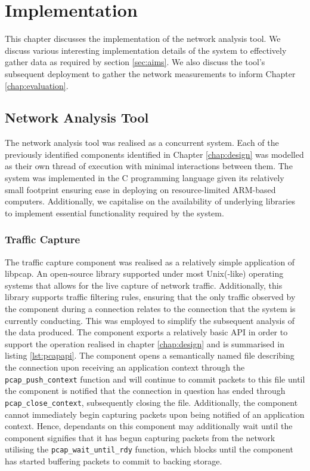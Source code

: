 \documentclass{l4proj}
\begin{document}
\chapter{Implementation}
\label{chap:implementation}


This chapter discusses the implementation of the network analysis tool. We discuss various interesting implementation details of the system to effectively gather data as required by section \ref{sec:aims}. We also discuss the tool's subsequent deployment to gather the network measurements to inform Chapter \ref{chap:evaluation}.

\section{Network Analysis Tool}

The network analysis tool was realised as a concurrent system. Each of the previously identified components identified in Chapter \ref{chap:design} was modelled as their own thread of execution with minimal interactions between them. The system was implemented in the C programming language given its relatively small footprint ensuring ease in deploying on resource-limited ARM-based computers. Additionally, we capitalise on the availability of underlying libraries to implement essential functionality required by the system.

\subsection{Traffic Capture}

The traffic capture component was realised as a relatively simple application of libpcap. An open-source library supported under most Unix(-like) operating systems that allows for the live capture of network traffic. Additionally, this library supports traffic filtering rules, ensuring that the only traffic observed by the component during a connection relates to the connection that the system is currently conducting. This was employed to simplify the subsequent analysis of the data produced. The component exports a relatively basic API in order to support the operation realised in chapter \ref{chap:design} and is summarised in listing \ref{lst:pcapapi}. The component opens a semantically named file describing the connection upon receiving an application context through the \lstinline{pcap_push_context} function and will continue to commit packets to this file until the component is notified that the connection in question has ended through \lstinline{pcap_close_context}, subsequently closing the file. Additionally, the component cannot immediately begin capturing packets upon being notified of an application context. Hence, dependants on this component may additionally wait until the component signifies that it has begun capturing packets from the network utilising the \lstinline{pcap_wait_until_rdy} function, which blocks until the component has started buffering packets to commit to backing storage.
\end{document}
